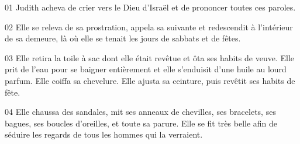 01 Judith acheva de crier vers le Dieu d'Israël et de prononcer toutes ces paroles.

02 Elle se releva de sa prostration, appela sa suivante et redescendit à l'intérieur de sa demeure, là où elle se tenait les jours de sabbats et de fêtes.

03 Elle retira la toile à sac dont elle était revêtue et ôta ses habits de veuve. Elle prit de l'eau pour se baigner entièrement et elle s'enduisit d'une huile au lourd parfum. Elle coiffa sa chevelure. Elle ajusta sa ceinture, puis revêtit ses habits de fête.

04 Elle chaussa des sandales, mit ses anneaux de chevilles, ses bracelets, ses bagues, ses boucles d'oreilles, et toute sa parure. Elle se fit très belle afin de séduire les regards de tous les hommes qui la verraient.
